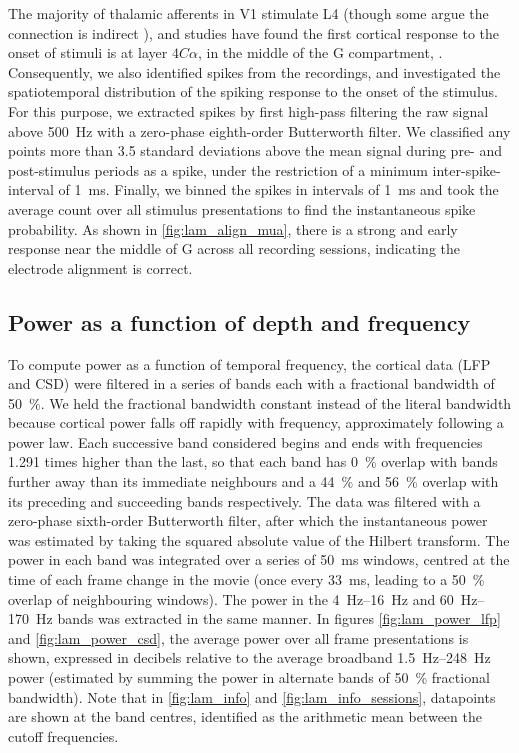 The majority of thalamic afferents in \ac{V1} stimulate \ac{L4} (though some argue the connection is indirect \citealp{Hansen2012}), and studies have found the first cortical response to the onset of stimuli is at layer $4C\alpha$, in the middle of the \ac{G} compartment, \citep{Callaway1998}.
Consequently, we also identified spikes from the recordings, and investigated the spatiotemporal distribution of the spiking response to the onset of the stimulus.
For this purpose, we extracted spikes by first high-pass filtering the raw signal above \SI{500}{Hz} with a zero-phase eighth-order Butterworth filter.
We classified any points more than \num{3.5} standard deviations above the mean signal during pre- and post-stimulus periods as a spike, under the restriction of a minimum inter-spike-interval of \SI{1}{\milli\second}.
Finally, we binned the spikes in intervals of \SI{1}{\milli\second} and took the average count over all stimulus presentations to find the instantaneous spike probability.
As shown in \autoref{fig:lam_align_mua}, there is a strong and early response near the middle of \ac{G} across all recording sessions, indicating the electrode alignment is correct.


\subsection{Power as a function of depth and frequency}
\label{sec:lam_power_method}

To compute power as a function of temporal frequency, the cortical data (\ac{LFP} and \ac{CSD}) were filtered in a series of bands each with a fractional bandwidth of \SI{50}{\percent}.
We held the fractional bandwidth constant instead of the literal bandwidth because cortical power falls off rapidly with frequency, approximately following a power law.
Each successive band considered begins and ends with frequencies \num{1.291} times higher than the last, so that each band has \SI{0}{\percent} overlap with bands further away than its immediate neighbours and a \SI{44}{\percent} and \SI{56}{\percent} overlap with its preceding and succeeding bands respectively.
The data was filtered with a zero-phase sixth-order Butterworth filter, after which the instantaneous power was estimated by taking the squared absolute value of the Hilbert transform.
The power in each band was integrated over a series of \SI{50}{\milli\second} windows, centred at the time of each frame change in the movie (once every \SI{33}{\milli\second}, leading to a \SI{50}{\percent} overlap of neighbouring windows).
The power in the \SIrange{4}{16}{Hz} and \SIrange{60}{170}{Hz} bands was extracted in the same manner.
In figures \ref{fig:lam_power_lfp} and \ref{fig:lam_power_csd}, the average power over all frame presentations is shown, expressed in decibels relative to the average broadband \SIrange{1.5}{248}{Hz} power (estimated by summing the power in alternate bands of \SI{50}{\percent} fractional bandwidth).
Note that in \autoref{fig:lam_info} and \autoref{fig:lam_info_sessions}, datapoints are shown at the band centres, identified as the arithmetic mean between the cutoff frequencies.


